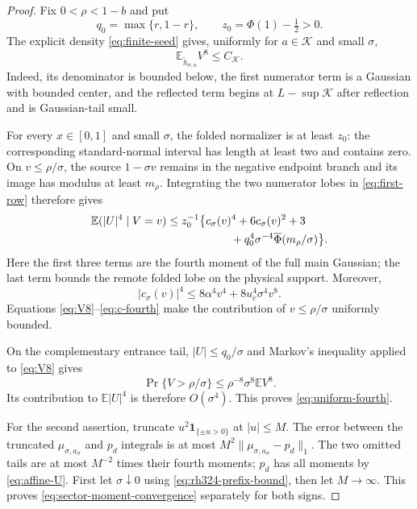 \documentclass[11pt]{article}
\theoremstyle{definition}
\theoremstyle{remark}
\newcommand{\1}{\mathbf 1}
\begin{document}
\begin{proof}
Fix $0<\rho<1-b$ and put
\[
 q_0=\max\{r,1-r\},
 \qquad z_0=\Phi(1)-\tfrac12>0.
\]
The explicit density \eqref{eq:finite-seed} gives, uniformly for
$a\in\mathcal K$ and small $\sigma$,
\begin{equation}\label{eq:V8}
 \mathbb E_{\widetilde h_{\sigma,a}}V^8\le C_{\mathcal K}.
\end{equation}
Indeed, its denominator is bounded below, the first numerator term is a
Gaussian with bounded center, and the reflected term begins at
$L-\sup\mathcal K$ after reflection and is Gaussian-tail small.

For every $x\in[0,1]$ and small $\sigma$, the folded normalizer is at least
$z_0$: the corresponding standard-normal interval has length at least two
and contains zero.  On $v\le\rho/\sigma$, the source $1-\sigma v$ remains
in the negative endpoint branch and its image has modulus at least
$m_\rho$.  Integrating the two numerator lobes in \eqref{eq:first-row}
therefore gives
\begin{align}
 \mathbb E(|U|^4\mid V=v)
 &\le z_0^{-1}\bigl\{c_\sigma(v)^4+6c_\sigma(v)^2+3\nonumber\\
 &\hspace{5.7em}{}+q_0^4\sigma^{-4}
 \overline\Phi(m_\rho/\sigma)\bigr\}.
 \label{eq:conditional-fourth}
\end{align}
Here the first three terms are the fourth moment of the full main Gaussian;
the last term bounds the remote folded lobe on the physical support.
Moreover,
\begin{equation}\label{eq:c-fourth}
 |c_\sigma(v)|^4
 \le8\alpha^4v^4+8u_c^4\sigma^4v^8.
\end{equation}
Equations \eqref{eq:V8}--\eqref{eq:c-fourth} make the contribution of
$v\le\rho/\sigma$ uniformly bounded.

On the complementary entrance tail, $|U|\le q_0/\sigma$ and Markov's
inequality applied to \eqref{eq:V8} gives
\[
 \Pr\{V>\rho/\sigma\}
 \le \rho^{-8}\sigma^8\mathbb EV^8.
\]
Its contribution to $\mathbb E|U|^4$ is therefore $O(\sigma^4)$.  This
proves \eqref{eq:uniform-fourth}.

For the second assertion, truncate $u^2\1_{\{\pm u>0\}}$ at $|u|\le M$.
The error between the truncated $\mu_{\sigma,a_\sigma}$ and $p_d$ integrals
is at most $M^2\|\mu_{\sigma,a_\sigma}-p_d\|_1$.  The two omitted tails are
at most $M^{-2}$ times their fourth moments; $p_d$ has all moments by
\eqref{eq:affine-U}.  First let $\sigma\downarrow0$ using
\eqref{eq:rh324-prefix-bound}, then let $M\to\infty$.  This proves
\eqref{eq:sector-moment-convergence} separately for both signs.
\end{proof}
\end{document}
